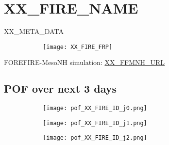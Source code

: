 \newpage
\vspace{-1em}
\section*{XX_FIRE_NAME}
\label{sec:fireIDXX_FIRE_ID}
\vspace{-1em}
\parbox{\linewidth}{\small{ XX_META_DATA}}
\begin{figure}[H]
    \centering
    \begin{subfigure}[b]{0.3\textwidth}
        \centering
    \end{subfigure}
    \begin{subfigure}[b]{0.69\textwidth}
        \centering
         \texttt{[image: XX\_FIRE\_FRP]}
    \end{subfigure}
\end{figure}
\vspace{-2em}
\small{ FOREFIRE-MesoNH simulation:  \url{XX_FFMNH_URL} }
\vspace{-1em}
\subsection*{POF over next 3 days}
\vspace{-1em}
\begin{figure}[H]
    \centering
    \begin{subfigure}[b]{0.31\textwidth}
        \centering
        \texttt{[image: pof\_XX\_FIRE\_ID\_j0.png]} %
    \end{subfigure}
    \begin{subfigure}[b]{0.31\textwidth}
        \centering
        \texttt{[image: pof\_XX\_FIRE\_ID\_j1.png]} %
    \end{subfigure}
    \begin{subfigure}[b]{0.36\textwidth}
        \centering
        \texttt{[image: pof\_XX\_FIRE\_ID\_j2.png]} %
    \end{subfigure}
\end{figure}


\vspace{-1em}
